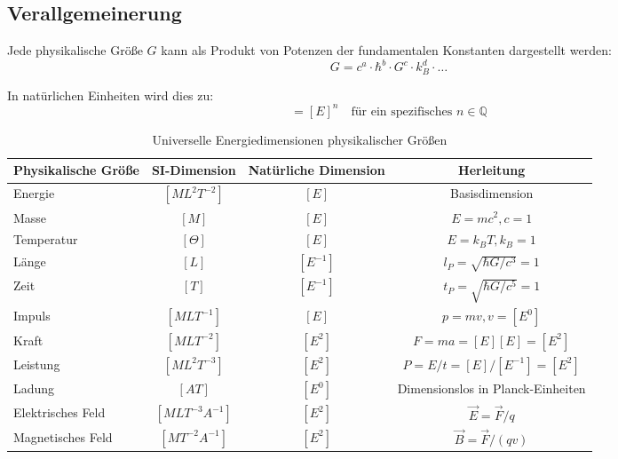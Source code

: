 \documentclass[11pt,a4paper]{article}
\begin{document}
	\subsection{Verallgemeinerung}
	
	Jede physikalische Größe $G$ kann als Produkt von Potenzen der fundamentalen Konstanten dargestellt werden:
	\begin{equation}
		G = c^a \cdot \hbar^b \cdot G^c \cdot k_B^d \cdot \ldots
	\end{equation}
	
	In natürlichen Einheiten wird dies zu:
	\begin{equation}
		[G] = [E]^n \quad \text{für ein spezifisches } n \in \mathbb{Q}
	\end{equation}
	
	\begin{table}[htbp]
		\centering
		\begin{adjustbox}{width=0.9\textwidth}
			\begin{tabular}{lccc}
				\toprule
				\textbf{Physikalische Größe} & \textbf{SI-Dimension} & \textbf{Natürliche Dimension} & \textbf{Herleitung} \\
				\midrule
				Energie & $[ML^2T^{-2}]$ & $[E]$ & Basisdimension \\
				Masse & $[M]$ & $[E]$ & $E = mc^2, c = 1$ \\
				Temperatur & $[\Theta]$ & $[E]$ & $E = k_BT, k_B = 1$ \\
				Länge & $[L]$ & $[E^{-1}]$ & $l_P = \sqrt{\hbar G/c^3} = 1$ \\
				Zeit & $[T]$ & $[E^{-1}]$ & $t_P = \sqrt{\hbar G/c^5} = 1$ \\
				Impuls & $[MLT^{-1}]$ & $[E]$ & $p = mv, v = [E^0]$ \\
				Kraft & $[MLT^{-2}]$ & $[E^2]$ & $F = ma = [E][E] = [E^2]$ \\
				Leistung & $[ML^2T^{-3}]$ & $[E^2]$ & $P = E/t = [E]/[E^{-1}] = [E^2]$ \\
				Ladung & $[AT]$ & $[E^0]$ & Dimensionslos in Planck-Einheiten \\
				Elektrisches Feld & $[MLT^{-3}A^{-1}]$ & $[E^2]$ & $\vec{E} = \vec{F}/q$ \\
				Magnetisches Feld & $[MT^{-2}A^{-1}]$ & $[E^2]$ & $\vec{B} = \vec{F}/(qv)$ \\
				\bottomrule
			\end{tabular}
		\end{adjustbox}
		\caption{Universelle Energiedimensionen physikalischer Größen}
		\label{tab:energiedimensionen}
	\end{table}
	
\end{document}
